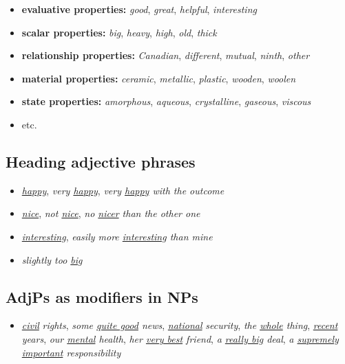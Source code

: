 \begin{itemize}[noitemsep]
    \item \textbf{evaluative properties:} \textit{good}, \textit{great}, \textit{helpful}, \textit{interesting}
    \item \textbf{scalar properties:} \textit{big}, \textit{heavy}, \textit{high}, \textit{old}, \textit{thick}
    \item \textbf{relationship properties:} \textit{Canadian}, \textit{different}, \textit{mutual}, \textit{ninth}, \textit{other}
    \item \textbf{material properties:} \textit{ceramic}, \textit{metallic}, \textit{plastic}, \textit{wooden}, \textit{woolen}
    \item \textbf{state properties:} \textit{amorphous}, \textit{aqueous}, \textit{crystalline}, \textit{gaseous}, \textit{viscous}
    \item etc.
\end{itemize}

\subsection*{Heading adjective phrases}
\begin{itemize}[noitemsep]
    \item \textit{\uline{happy}}, \textit{very \uline{happy}}, \textit{very \uline{happy} with the outcome}
    \item \textit{\uline{nice}}, \textit{not \uline{nice}}, \textit{no \uline{nicer} than the other one}
    \item \textit{\uline{interesting}}, \textit{easily more \uline{interesting} than mine}
    \item \textit{slightly too \uline{big}}
\end{itemize}

\subsection*{AdjPs as modifiers in NPs}
\begin{itemize}[noitemsep]
    \item \uline{\textit{civil}} \textit{rights}, \textit{some \uline{quite good} news},  \uline{\textit{national}} \textit{security}, \textit{the \uline{whole} thing}, \uline{\textit{recent}} \textit{years}, \textit{our \uline{mental} health}, \textit{her \uline{very best} friend}, \textit{a \uline{really big} deal}, \textit{a \uline{supremely important} responsibility}
\end{itemize}

